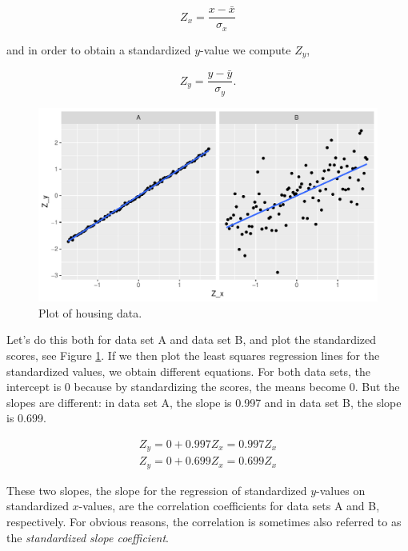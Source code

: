 \documentclass[]{book}\usepackage[]{graphicx}\usepackage[]{color}
\makeatletter
\def\maxwidth{ %
  \ifdim\Gin@nat@width>\linewidth
    \linewidth
  \else
    \Gin@nat@width
  \fi
}
\newenvironment{knitrout}{}{} %
\makeatother
\begin{document}
\begin{equation}
Z_x = \frac{x- \bar{x}}{\sigma_x}
\end{equation}

and in order to obtain a standardized $y$-value we compute $Z_y$,

\begin{equation}
Z_y = \frac{y- \bar{y}}{\sigma_y}.
\end{equation}



\begin{knitrout}
\color{fgcolor}\begin{figure}

{\centering \includegraphics[width=\maxwidth]{figure/lm_19-1} 

}

\caption[Plot of housing data]{Plot of housing data.}\label{fig:lm_19}
\end{figure}


\end{knitrout}

Let's do this both for data set A and data set B, and plot the standardized scores, see Figure \ref{fig:lm_19}. If we then plot the least squares regression lines for the standardized values, we obtain different equations. For both data sets, the intercept is 0 because by standardizing the scores, the means become 0. But the slopes are different: in data set A, the slope is 0.997 and in data set B, the slope is 0.699.

\begin{eqnarray}
Z_y = 0 + 0.997Z_x=0.997Z_x \\
Z_y = 0 + 0.699Z_x=0.699Z_x
\end{eqnarray}


These two slopes, the slope for the regression of standardized $y$-values on standardized $x$-values, are the correlation coefficients for data sets A and B, respectively. For obvious reasons, the correlation is sometimes also referred to as the \textit{standardized slope coefficient}.
\end{document}
